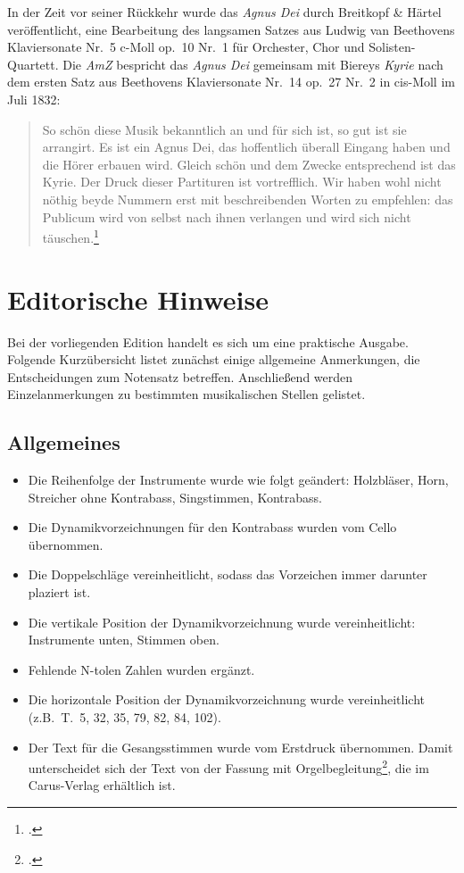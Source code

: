 \documentclass[paper=A3,12pt]{scrartcl}
\begin{document}
In der Zeit vor seiner Rückkehr wurde das \textit{Agnus Dei} durch Breitkopf \& Härtel veröffentlicht, eine Bearbeitung des langsamen Satzes aus Ludwig van Beethovens Klaviersonate Nr.~5 c-Moll op.~10 Nr.~1 für Orchester, Chor und Solisten-Quartett. %
Die \textit{AmZ} bespricht das \textit{Agnus Dei} gemeinsam mit Biereys \textit{Kyrie} nach dem ersten Satz aus Beethovens Klaviersonate Nr.~14 op.~27 Nr.~2 in cis-Moll im Juli 1832:

\begin{quote}
  So schön diese Musik bekanntlich an und für sich ist, so gut ist sie arrangirt.
  Es ist ein Agnus Dei, das hoffentlich überall Eingang haben und die Hörer erbauen wird.
  Gleich schön und dem Zwecke entsprechend ist das Kyrie.
  Der Druck dieser Partituren ist vortrefflich.
  Wir haben wohl nicht nöthig beyde Nummern erst mit beschreibenden Worten zu empfehlen:
  das Publicum wird von selbst nach ihnen verlangen und wird sich nicht täuschen.\footcite{1832_NA_Rezension_AMZ}
\end{quote}


\section{Editorische Hinweise}

Bei der vorliegenden Edition handelt es sich um eine praktische Ausgabe.
Folgende Kurzübersicht listet zunächst einige allgemeine Anmerkungen, die Entscheidungen zum Notensatz betreffen.
Anschließend werden Einzelanmerkungen zu bestimmten musikalischen Stellen gelistet.

\subsection{Allgemeines}

\begin{itemize}
  \setlength\itemsep{0.0\baselineskip}
  \item Die Reihenfolge der Instrumente wurde wie folgt geändert: Holzbläser, Horn, Streicher ohne Kontrabass, Singstimmen, Kontrabass.
  \item Die Dynamikvorzeichnungen für den Kontrabass wurden vom Cello übernommen.
  \item Die Doppelschläge vereinheitlicht, sodass das Vorzeichen immer darunter plaziert ist.
  \item Die vertikale Position der Dynamikvorzeichnung wurde vereinheitlicht: Instrumente unten, Stimmen oben.
  \item Fehlende N-tolen Zahlen wurden ergänzt.
  \item Die horizontale Position der Dynamikvorzeichnung wurde vereinheitlicht (z.B.\ T.\ 5, 32, 35, 79, 82, 84, 102).
  \item Der Text für die Gesangsstimmen wurde vom Erstdruck übernommen. Damit unterscheidet sich der Text von der Fassung mit Orgelbegleitung\footcite{2018_Schumacher_AgnusDei_Carus}, die im Carus-Verlag erhältlich ist.
\end{itemize}
\end{document}
